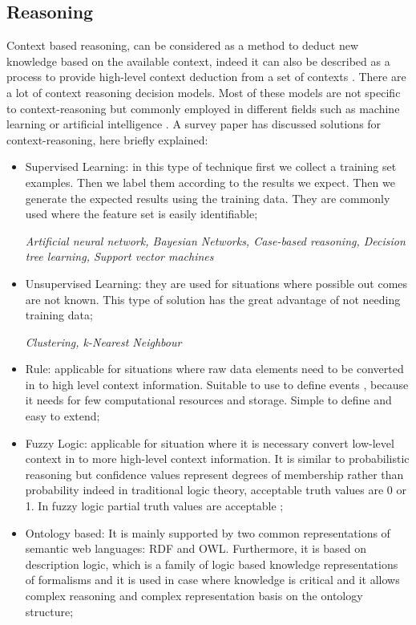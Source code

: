 \documentclass{thesisreport}
\begin{document}
 \subsection{Reasoning}
 Context based reasoning, can be considered as a method to deduct new knowledge based on the available context, indeed it can also be described as a process to provide high-level context deduction from a set of contexts \cite{perera2014context}.
 There are a lot of context reasoning decision models. Most of these models are not specific to context-reasoning but commonly employed in different fields such as machine learning or artificial intelligence \cite{perera2014context}.
 A survey paper \cite{perera2014context} has discussed solutions for context-reasoning, here briefly explained: 
 \begin{itemize}
     \item Supervised Learning: in this type of technique first we collect a training set examples. Then we label them according to the results we expect. Then we generate the expected results using the training data.
     They are commonly used where the feature set is easily identifiable;
     
     \textit{Artificial neural network, Bayesian Networks, Case-based reasoning, Decision tree learning, Support vector machines}
     \item Unsupervised Learning: they are used for situations where possible out comes are not known. This type of solution has the great advantage of not needing training data;
     
     \textit{Clustering, k-Nearest Neighbour}
     \item Rule: applicable for situations where raw data elements need to be converted in to high level context information. Suitable to use to define events , because it needs for few computational resources and storage. Simple to define and easy to extend; 
     \item Fuzzy Logic: applicable for situation where it is necessary convert low-level context in to more high-level context information. It is similar to probabilistic reasoning but confidence values represent degrees of membership rather than probability indeed in traditional logic theory, acceptable truth values are 0 or 1. In fuzzy logic partial truth values are acceptable \cite{perera2014context}; 
     \item Ontology based: It is mainly supported by two common representations of semantic web languages: RDF and OWL. Furthermore, it is based on description logic, which is a family of logic based knowledge representations of formalisms and it is used in case where knowledge is critical and it allows complex reasoning and complex representation basis on the ontology structure;
    

\end{itemize}
\end{document}
